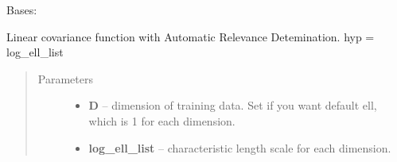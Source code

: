 \documentclass[letterpaper,10pt,english]{sphinxmanual}
\begin{document}
\begin{fulllineitems}
\label{pyGPs.Core:pyGPs.Core.cov.LINard}
Bases: {\hyperref[pyGPs.Core:pyGPs.Core.cov.Kernel]{}}

Linear covariance function with Automatic Relevance Detemination.
hyp = log\_ell\_list
\begin{quote}\begin{description}
\item[{Parameters}] \leavevmode\begin{itemize}
\item {} 
\textbf{D} -- dimension of training data. Set if you want default ell, which is 1 for each dimension.

\item {} 
\textbf{log\_ell\_list} -- characteristic length scale for each dimension.

\end{itemize}

\end{description}\end{quote}

\begin{fulllineitems}
\label{pyGPs.Core:pyGPs.Core.cov.LINard.getCovMatrix}
\end{fulllineitems}


\begin{fulllineitems}
\label{pyGPs.Core:pyGPs.Core.cov.LINard.getDerMatrix}
\end{fulllineitems}


\end{fulllineitems}

\end{document}
